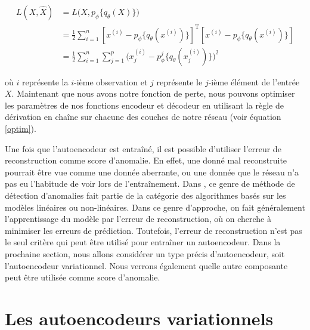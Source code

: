 \begin{equation} \label{perte1}
\begin{split}
L(X,\hat{X}) & = L\big(X, p_\phi\{q_\theta(X)\}\big) \\
& = \frac{1}{2} \sum_{i=1}^{n} [x^{(i)}-p_\phi\{q_\theta(x^{(i)})\}]^{\text{T}}[x^{(i)}-p_\phi\{q_\theta(x^{(i)})\}] \\
& = \frac{1}{2} \sum_{i=1}^{n} \sum_{j=1}^{p} \big(x_{j}^{(i)}-p^j_\phi\{q_\theta(x_{j}^{(i)})\}\big)^2
\end{split}
\end{equation}

où $i$ représente la $i$-ième observation et $j$ représente le $j$-ième élément de l'entrée $X$. Maintenant que nous avons notre fonction de perte, nous pouvons optimiser les paramètres de nos fonctions encodeur et décodeur en utilisant la règle de dérivation en chaîne sur chacune des couches de notre réseau (voir équation \ref{optim}).

Une fois que l'autoencodeur est entraîné, il est possible d'utiliser l'erreur de reconstruction comme score d'anomalie. En effet, une donné mal reconstruite pourrait être vue comme une donnée aberrante, ou une donnée que le réseau n'a pas eu l'habitude de voir lors de l'entraînement. Dans  \cite{10.5555/3086742}, ce genre de méthode de détection d'anomalies fait partie de la catégorie des algorithmes basés sur les modèles linéaires ou non-linéaires. Dans ce genre d'approche, on fait généralement l'apprentissage du modèle par l'erreur de reconstruction, où on cherche à minimiser les erreurs de prédiction. Toutefois, l'erreur de reconstruction n'est pas le seul critère qui peut être utilisé pour entraîner un autoencodeur. Dans la prochaine section, nous allons considérer un type précis d'autoencodeur, soit l'autoencodeur variationnel. Nous verrons également quelle autre composante peut être utilisée comme score d'anomalie.

\section{Les autoencodeurs variationnels} \label{background-vae}

